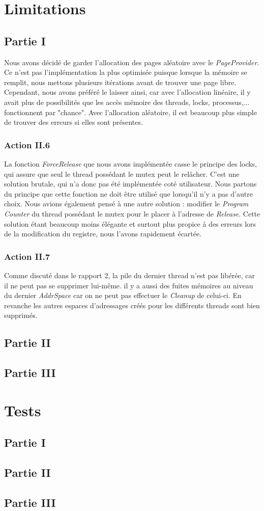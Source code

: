 \documentclass{article}
\begin{document}
\section{Limitations}
\subsection{Partie I}
Nous avons décidé de garder l'allocation des pages aléatoire avec le \textit{PageProvider}. Ce n'est pas
l'implémentation la plus optimisée puisque lorsque la mémoire se remplit, nous mettons plusieurs itérations avant
de trouver une page libre. Cependant, nous avons préféré le laisser ainsi, car avec l'allocation linéaire, il y avait
plus de possibilités que les accès mémoire des threads, locks, processus,... fonctionnent par "chance". Avec l'allocation
aléatoire, il est beaucoup plus simple de trouver des erreurs si elles sont présentes.

\subsubsection{Action II.6}
La fonction \textit{ForceRelease} que nous avons implémentée casse le principe des locks, qui assure que seul le thread possédant le mutex peut le relâcher.
C'est une solution brutale, qui n'a donc pas été implémentée coté utilisateur. Nous partons du principe que cette fonction ne doit être utilisé que
lorsqu'il n'y a pas d'autre choix. Nous avions également pensé à une autre solution : modifier le \textit{Program Counter} du thread possédant
le mutex pour le placer à l'adresse de \textit{Release}. Cette solution étant beaucoup moins élégante et surtout plus propice à des erreurs lors de la
modification du registre, nous l'avons rapidement écartée.

\subsubsection{Action II.7}
Comme discuté dans le rapport 2, la pile du dernier thread n'est pas libérée, car il ne peut pas se supprimer lui-même. il y a aussi des fuites mémoires au niveau
du dernier \textit{AddrSpace} car on ne peut pas effectuer le \textit{Cleanup} de celui-ci. En revanche les autres espaces d'adressages créés pour les différents
threads sont bien supprimés.
\subsection{Partie II}

\subsection{Partie III}


\section{Tests}
\subsection{Partie I}

\subsection{Partie II}

\subsection{Partie III}
\end{document}
